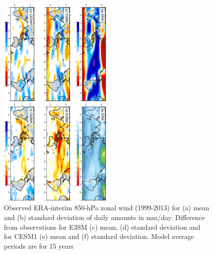 \documentclass[draft,ms]{AGUTeX}
\begin{document}
\begin{article}
\begin{figure}[t]
  \begin{center}
    \noindent\includegraphics[width=0.5\textwidth,angle=90.]{./figs/f_mean_var_U850_DJF.pdf}
  \end{center}
  \caption{Observed ERA-interim 850-hPa zonal wind (1999-2013) for (a) mean and (b) standard deviation of daily amounts in mm/day. Difference from observations for E3SM (c) mean, (d) standard deviation and for CESM1 (e) mean and (f) standard deviation. Model average periods are for 15 years} 
\label{f_mean_var_U850_DJF}
\end{figure}




\end{article}
\end{document}
